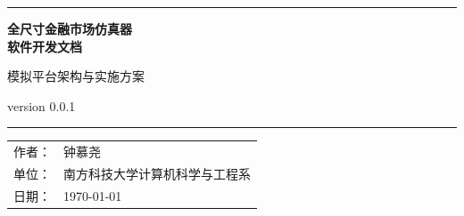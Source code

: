 \documentclass[UTF8,a4paper,12pt]{ctexart}
\begin{document}
\begin{titlepage}
    \centering
    \vspace*{1.5cm}

    \rule{\textwidth}{1.5pt} \par
    \vspace{0.8cm}

    {\Huge\bfseries 全尺寸金融市场仿真器\\软件开发文档\par}
    \vspace{0.5cm}
    {\Large 模拟平台架构与实施方案\par}
    \vspace{0.3cm}
    {\normalsize version 0.0.1\par}

    \vspace{0.8cm}
    \rule{\textwidth}{1pt} \par

    \vspace{4cm}
        \begin{tabular}{@{}rl@{}}
        作者： & 钟慕尧 \\
        单位： & 南方科技大学计算机科学与工程系 \\
        日期： & \today \\
        \end{tabular}

    \vspace{0.8cm}

    \vfill
\end{titlepage}

\tableofcontents
\thispagestyle{empty}

\newpage


\newpage


\newpage


\newpage


\newpage



\newpage


\newpage


\newpage
\end{document}
